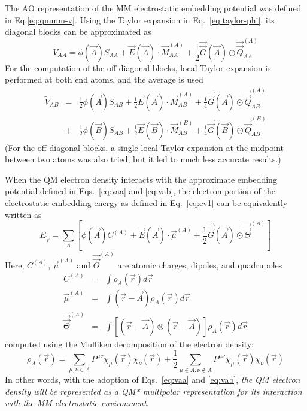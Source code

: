 \documentclass[aip,jcp,preprint,superscriptaddress,amsmath,amssymb]{revtex4-1}
\begin{document}
The AO representation of the MM electrostatic embedding potential was defined in Eq.\ref{eq:qmmm-v}.  
Using the Taylor expansion in Eq.~\ref{eq:taylor-phi}, its diagonal blocks can be approximated as 
\begin{equation}
\tilde{V}_{AA} = \phi(\vec{A}) S_{AA} +  \vec{E}(\vec{A}) \cdot \vec{M}_{AA}^{(A)} + \frac{1}{2} \vec{\vec{G}} (\vec{A}) \odot \vec{\vec{Q}}_{AA}^{(A)} 
\label{eq:vaa}
\end{equation}
For the computation of the off-diagonal blocks, local Taylor expansion is performed at both end atoms, and the average is used
\begin{eqnarray}
\tilde{V}_{AB} & = & \frac{1}{2}\phi(\vec{A}) S_{AB} +  \frac{1}{2} \vec{E} (\vec{A})  \cdot \vec{M}_{AB}^{(A)} + \frac{1}{4} \vec{\vec{G}} (\vec{A}) \odot \vec{\vec{Q}}_{AB}^{(A)}   \nonumber  \\
   & + & \frac{1}{2}\phi(\vec{B}) S_{AB} +  \frac{1}{2} \vec{E} (\vec{B})  \cdot \vec{M}_{AB}^{(B)} + \frac{1}{4} \vec{\vec{G}} (\vec{B}) \odot \vec{\vec{Q}}_{AB}^{(B)}   \label{eq:vab}
\end{eqnarray}
(For the off-diagonal blocks, a single local Taylor expansion at the midpoint between two atoms was also tried, 
but it led to much less accurate results.)    

When the QM electron density interacts with the approximate embedding potential defined in Eqs.~\ref{eq:vaa} and \ref{eq:vab}, 
the electron portion of the electrostatic embedding energy  as defined in Eq.~\ref{eq:ev1} can be equivalently written as 
\begin{equation}
E_{\tilde{V}} = \sum_A \left[ \phi (\vec{A}) C^{(A)} +   \vec{E}(\vec{A})  \cdot \vec{\mu} ^{(A)} + \frac{1}{2}  \vec{\vec{G}} (\vec{A}) \odot \vec{\vec{\Theta}}^{(A)}  \right]
\end{equation}
Here, $C^{(A)}$, $\vec{\mu} ^{(A)}$ and $ \vec{\vec{\Theta}}^{(A)} $ are atomic charges, dipoles, and quadrupoles
\begin{eqnarray}
C^{(A)} & = &  \int \rho_A(\vec{r}) d\vec{r}   \label{eq:atomic-charges} \\
\vec{\mu} ^{(A)} & = & \int (\vec{r} - \vec{A}) \rho_A(\vec{r}) d\vec{r} \label{eq:atomic-dipoles}  \\
\vec{\vec{\Theta}}^{(A)} & =  & \int  \left[ (\vec{r} - \vec{A})  \otimes  (\vec{r} - \vec{A})  \right]  \rho_A(\vec{r}) d\vec{r}     \label{eq:atomic-quadrupoles}
\end{eqnarray}
computed using the Mulliken decomposition of the electron density:
\begin{equation}
\rho_A(\vec{r}) = \sum_{\mu, \nu \in A} P^{\mu \nu}  \chi_{\mu} (\vec{r})   \chi_{\nu} (\vec{r})  + \frac{1}{2} \sum_{\mu \in A, \nu \notin A }   P^{\mu \nu}  \chi_{\mu} (\vec{r})   \chi_{\nu} (\vec{r}) 
\end{equation}
In other words, with the adoption of Eqs.~\ref{eq:vaa} and \ref{eq:vab}, \emph{the QM electron density will be represented as a QM* multipolar representation for its interaction with the MM electrostatic environment}.   
\end{document}
